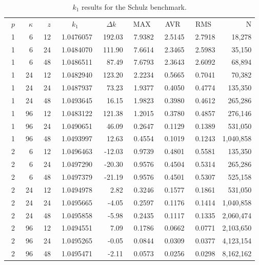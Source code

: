\documentclass[runningheads,a4paper]{llncs}
\begin{document}
\begin{table}[htp]
\caption{$k_1$ results for the Schulz benchmark.}
\label{t-2}
\begin{center}
\begin{tabular}{rrrrrrrrr}
\rowcolor{col1}
$p$ & $\kappa$ & $z$ &\multicolumn{1}{c}{$k_1$} & \multicolumn{1}{c}{$\Delta k$} & \multicolumn{1}{c}{MAX} & \multicolumn{1}{c}{AVR}& \multicolumn{1}{c}{RMS}& N \\
\rowcolor{col3}
~1& ~~6& ~12& ~1.0476057& ~192.03& ~7.9382& ~2.5145& ~2.7918& 18,278 \\
\rowcolor{col2}
1& 6& 24& 1.0484070& 111.90& 7.6614& 2.3465& 2.5983& 35,150 \\
\rowcolor{col1}
1& 6& 48& 1.0486511& 87.49& 7.6793& 2.3643& 2.6092& 68,894 \\
\rowcolor{col3}
1& 24& 12& 1.0482940& 123.20& 2.2234& 0.5665& 0.7041& 70,382 \\
\rowcolor{col3}
1& 24& 24& 1.0487937& 73.23& 1.9377& 0.4050& 0.4774& 135,350 \\
\rowcolor{col1}
1& 24& 48& 1.0493645& 16.15& 1.9823& 0.3980& 0.4612& 265,286\\
\rowcolor{col3}
1& 96& 12& 1.0483122& 121.38& 1.2015& 0.3780& 0.4857& 276,146\\
\rowcolor{col2}
1& 96& 24& 1.0490651& 46.09& 0.2647& 0.1129& 0.1389& 531,050\\
\rowcolor{col1}
1& 96& 48& 1.0493997& 12.63& 0.4554& 0.1019& 0.1243& 1,040,858\\
\rowcolor{col3}
2& 6& 12& 1.0496463& -12.03& 0.9739& 0.4801& 0.5581& 135,350\\
\rowcolor{green}
2& 6& 24& 1.0497290& -20.30& 0.9576& 0.4504& 0.5314& 265,286\\
\rowcolor{col1}
2& 6& 48& 1.0497379& -21.19& 0.9576& 0.4501& 0.5307& 525,158\\
\rowcolor{col3}
2& 24& 12& 1.0494978& 2.82& 0.3246& 0.1577& 0.1861& 531,050\\
\rowcolor{col2}
2& 24& 24& 1.0495665& -4.05& 0.2597& 0.1176& 0.1414& 1,040,858\\
\rowcolor{col1}
2& 24& 48& 1.0495858& -5.98& 0.2435& 0.1117& 0.1335& 2,060,474\\
\rowcolor{col3}
2& 96& 12& 1.0494551& 7.09& 0.1786& 0.0662& 0.0771& 2,103,650\\
\rowcolor{col2}
2& 96& 24& 1.0495265& -0.05& 0.0844& 0.0309& 0.0377& 4,123,154\\
\rowcolor{col1}
2& 96& 48& 1.0495471& -2.11& 0.0573& 0.0256& 0.0298& 8,162,162\\

\end{tabular}
\end{center}
\end{table}
\end{document}
